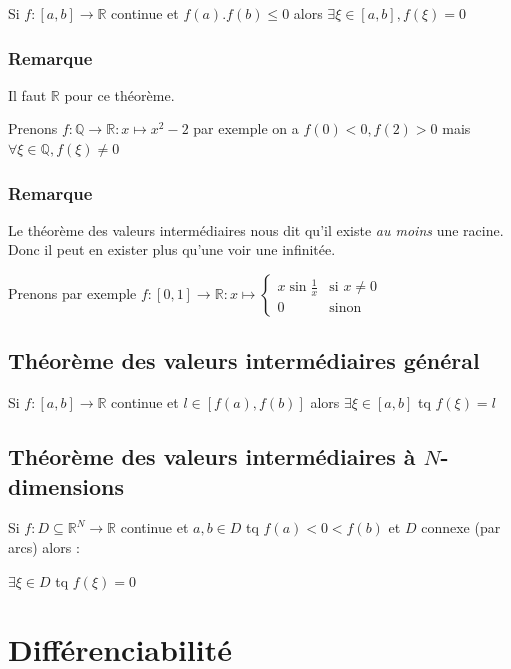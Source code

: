\documentclass[a4paper,10pt]{article}
\newcommand{\ap}{\rightarrow}
\newcommand{\R}{\mathbb{R}}
\newcommand{\Q}{\mathbb{Q}}
\begin{document}
Si $f : [a,b] \ap \R$ continue et $f(a).f(b) \leq 0$ alors $\exists \xi \in [a,b], f(\xi) = 0$

\subsubsection{Remarque}

Il faut $\R$ pour ce théorème.

Prenons $f: \Q \ap \R : x \mapsto x^2 - 2$ par exemple on a $f(0) < 0, f(2) > 0$ mais $\forall \xi \in \Q, f(\xi) \neq 0$

\newpage

\subsubsection{Remarque}

Le théorème des valeurs intermédiaires nous dit qu'il existe \textit{au moins} une racine. Donc il peut en exister plus qu'une voir une infinitée.

Prenons par exemple $f:[0,1] \ap \R : x \mapsto \begin{cases} x \sin \frac{1}{x} & \mbox{si } x \neq 0\\ 0 & \mbox{sinon}\end{cases}$  

\begin{figure}[h]
\end{figure}

\subsection{Théorème des valeurs intermédiaires général}

Si $f : [a, b] \ap \R$ continue et $l \in [f(a),f(b)]$ alors $\exists \xi \in [a,b]$ tq $f(\xi) = l$


\subsection{Théorème des valeurs intermédiaires à $N$-dimensions}

Si $f : D \subseteq \R^N \ap \R$ continue et $a,b \in D$ tq $f(a) < 0 < f(b)$ et $D$ connexe (par arcs) alors :

$\exists \xi \in D$ tq $f(\xi) = 0$

\section{Différenciabilité}
\end{document}
